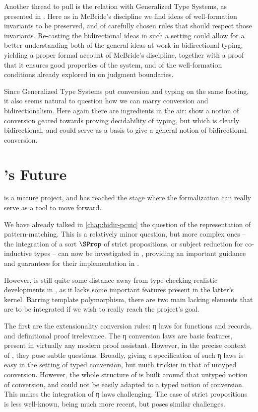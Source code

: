 Another thread to pull is the relation with Generalized Type Systems, as presented in
. Here as in McBride’s discipline we find ideas
of well-formation invariants to be preserved,
and of carefully chosen rules that should respect those invariants. Re-casting
the bidirectional ideas in such a setting could allow for a better understanding both of the
general ideas at work in bidirectional typing,
yielding a proper formal account of McBride’s discipline, together with a proof that it ensures
good properties of the system, and of the well-formation conditions already explored in
\textcite{Bauer2020} on judgment boundaries.

Since Generalized Type Systems put conversion and typing on the same footing, it also seems natural
to question how we can marry conversion and bidirectionalism. Here again there are ingredients in
the air:  show a notion of conversion geared towards proving decidability
of typing, but which is clearly bidirectional, and could serve as a basis to give a general
notion of bidirectional conversion.

\section{’s Future}

 is a mature project, and has reached the stage
where the formalization can really
serve as a tool to move  forward.

We have already talked in
\cref{chap:bidir-pcuic} the question of the representation of pattern-matching.
This is a relatively minor question, but more complex ones – \eg 
the integration of a sort $\SProp$ of strict propositions, or subject reduction for
co-inductive types –
can now be investigated in , providing an important guidance and guarantees 
for their implementation in .

However,  is still quite some distance away from type-checking realistic developments
in , as it lacks some important features present in the latter’s kernel. Barring
template polymorphism,%
there are two main lacking elements that are to be integrated if we wish to really reach the
project’s goal.

The first are the extensionality conversion rules: η laws for functions and records,
and definitional proof irrelevance.
The η conversion laws are basic features, present in virtually any modern proof assistant. However,
in the precise context of , they pose subtle questions.%
%
Broadly, giving a specification of such η laws is easy in the setting of typed conversion, but
much trickier in that of untyped conversion. However, the whole structure of  is built
around that untyped notion of conversion, and could not be easily adapted to a typed notion of
conversion. This makes the integration of η laws challenging. The case of strict propositions is
less well-known, being much more recent, but poses similar challenges.

